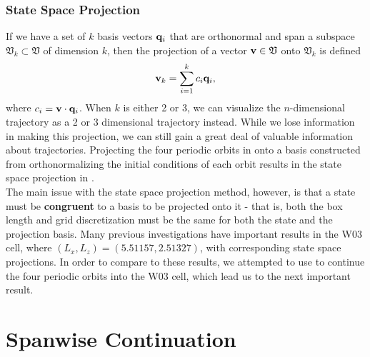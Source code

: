 \subsubsection{State Space Projection}
If we have a set of $k$ basis vectors $\mathbf{q}_i$ that are orthonormal and span a subspace $\mathfrak{V}_k \subset \mathfrak{V}$ of dimension $k$, then the projection of a vector $\mathbf{v} \in \mathfrak{V}$ onto $\mathfrak{V}_k$ is defined 
\begin{equation}
\Vector{v}_k = \sum{i = 1}{k}{c_i \Vector{q}_i},
\end{equation}
where $c_i = \mathbf{v} \cdot \mathbf{q}_i$. When $k$ is either 2 or 3, we can visualize the $n$-dimensional trajectory as a 2 or 3 dimensional trajectory instead. While we lose information in making this projection, we can still gain a great deal of valuable information about trajectories. Projecting the four periodic orbits in  onto a basis constructed from orthonormalizing the initial conditions of each orbit results in the state space projection in .\\

 The main issue with the state space projection method, however, is that a state must be {\bf congruent} to a basis to be projected onto it - that is, both the box length and grid discretization must be the same for both the state and the projection basis. Many previous investigations have important results in the W03 cell, where $(L_x,L_z) = (5.51157,2.51327)$, with corresponding state space projections. In order to compare to these results, we attempted to use  to continue the four periodic orbits into the W03 cell, which lead us to the next important result.

\section{Spanwise Continuation}

